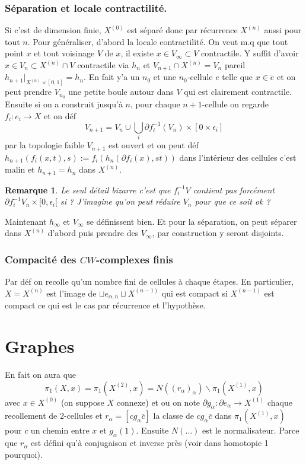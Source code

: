 \documentclass[a4paper,12pt]{book}
\theoremstyle{plain}
\newtheorem{rem}{Remarque}
\theoremstyle{definition}
\theoremstyle{remark}
\begin{document}
\subsection{Séparation et locale contractilité.}
Si c'est de dimension finie, $X^{(0)}$ est séparé donc par
récurrence $X^{(n)}$ aussi pour tout $n$. Pour généraliser, d'abord
la locale contractilité. On veut m.q que tout point $x$ et tout 
voisinage $V$ de $x$, il existe $x\in V_\infty\subset V$ 
contractile. Y suffit d'avoir $x\in V_n\subset X^{(n)}\cap V$
contractile via $h_n$ et $V_{n+1}\cap X^{(n)}=V_n$ pareil 
$h_{n+1}|_{X^{(n)}\times [0,1]}=h_n$. En fait y'a un $n_0$
et une $n_0$-cellule $e$ telle que $x\in \mathring e$ et on
peut prendre $V_{n_0}$ une petite boule autour dans $V$ qui
est clairement contractile. Ensuite
si on a construit jusqu'à $n$, pour chaque $n+1$-cellule on regarde
$f_i\colon e_i\to X$ et on déf 
\[V_{n+1}=V_n\cup \bigcup_i \partial f_i^{-1}(V_n)\times [0\times \epsilon_i]\]
par la topologie faible $V_{n+1}$ est ouvert et on peut déf
$h_{n+1}(f_i(x,t),s):=f_i(h_n(\partial f_i(x),st))$ dans 
l'intérieur des cellules c'est malin et $h_{n+1}=h_n$ dans 
$X^{(n)}$.

\begin{rem}
  Le seul détail bizarre c'est que $f_i^{-1} V$ contient pas
  forcément $\partial f_i^{-1} V_n \times [0,\epsilon_i[$ si ?
  J'imagine qu'on peut réduire $V_n$ pour que ce soit ok ?
\end{rem}

Maintenant $h_\infty$ et $V_\infty$ se définissent bien. Et pour
la séparation, on peut séparer dans $X^{(n)}$ d'abord puis
prendre des $V_\infty$, par construction y seront disjoints.



\subsection{Compacité des $CW$-complexes finis}

Par déf on recolle qu'un nombre fini de cellules à chaque étapes.
En particulier, $X=X^{(n)}$ est l'image de $\sqcup e_{\alpha,n}
\sqcup X^{(n-1)}$ qui est compact si $X^{(n-1)}$ est compact
ce qui est le cas par récurrence et l'hypothèse.

\chapter{Graphes}
En fait on aura que 
\[\pi_1(X,x)=\pi_1(X^{(2)},x)=N((r_\alpha)_\alpha)\backslash \pi_1(X^{(1)},x)\]
avec $x\in X^{(0)}$ (on suppose $X$ connexe) et ou on note
$\partial g_\alpha\colon \partial e_\alpha\to X^{(1)}$
chaque recollement de $2$-cellules et $r_\alpha=[cg_\alpha\bar c]$
la classe de $cg_\alpha\bar c$ dans $\pi_1(X^{(1)},x)$ pour $c$
un chemin entre $x$ et $g_\alpha(1)$. Ensuite $N(\ldots)$ est
le normalisateur. Parce que $r_\alpha$ est défini qu'à conjugaison
et inverse près (voir dans homotopie 1 pourquoi).
\end{document}
